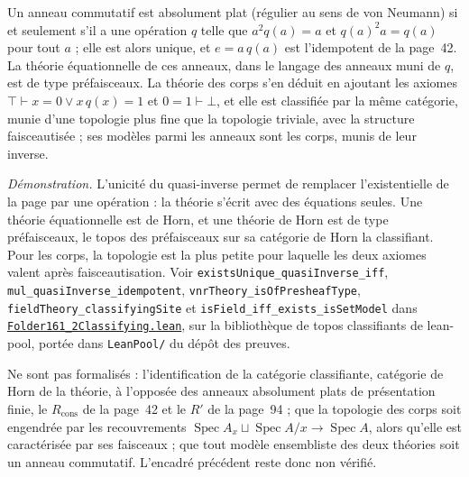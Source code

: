 \begin{encadre}
\begin{enonce}
Un anneau commutatif est absolument plat (régulier au sens de von Neumann) si et seulement s'il a une opération $q$ telle que $a^2 q(a) = a$ et $q(a)^2 a = q(a)$ pour tout $a$ ; elle est alors unique, et $e = a\,q(a)$ est l'idempotent de la page~42. La théorie équationnelle de ces anneaux, dans le langage des anneaux muni de $q$, est de type préfaisceaux. La théorie des corps s'en déduit en ajoutant les axiomes $\top \vdash x = 0 \vee x\,q(x) = 1$ et $0 = 1 \vdash \bot$, et elle est classifiée par la même catégorie, munie d'une topologie plus fine que la topologie triviale, avec la structure faisceautisée ; ses modèles parmi les anneaux sont les corps, munis de leur inverse.
\end{enonce}
\end{encadre}
{\small \emph{Démonstration.} L'unicité du quasi-inverse permet de remplacer l'existentielle de la page par une opération : la théorie s'écrit avec des équations seules. Une théorie équationnelle est de Horn, et une théorie de Horn est de type préfaisceaux, le topos des préfaisceaux sur sa catégorie de Horn la classifiant. Pour les corps, la topologie est la plus petite pour laquelle les deux axiomes valent après faisceautisation. Voir \texttt{existsUnique\_quasiInverse\_iff}, \texttt{mul\_quasiInverse\_idempotent}, \texttt{vnrTheory\_isOfPresheafType}, \texttt{fieldTheory\_classifyingSite} et \texttt{isField\_iff\_exists\_isSetModel} dans \href{\leanblobmain/CategoryTheory/Folder161_2Classifying.lean}{\texttt{Folder161\_2Classifying.\allowbreak{}lean}}, sur la bibliothèque de topos classifiants de lean-pool, portée dans \texttt{LeanPool/} du dépôt des preuves.

Ne sont pas formalisés : l'identification de la catégorie classifiante, catégorie de Horn de la théorie, à l'opposée des anneaux absolument plats de présentation finie, le $\widehat{R_{\mathrm{cons}}}$ de la page~42 et le $R'$ de la page~94 ; que la topologie des corps soit engendrée par les recouvrements $\operatorname{Spec} A_x \sqcup \operatorname{Spec} A/x \to \operatorname{Spec} A$, alors qu'elle est caractérisée par ses faisceaux ; que tout modèle ensembliste des deux théories soit un anneau commutatif. L'encadré précédent reste donc non vérifié.\par}

